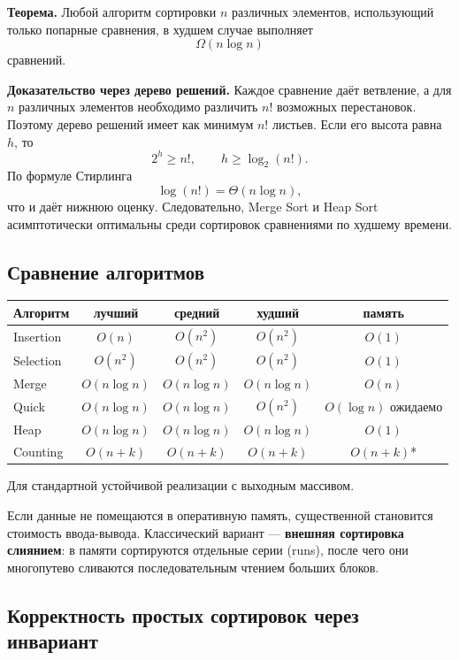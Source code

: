 \textbf{Теорема.} Любой алгоритм сортировки $n$ различных элементов, использующий только попарные сравнения, в худшем случае выполняет
\[
\Omega(n\log n)
\]
сравнений.

\textbf{Доказательство через дерево решений.} Каждое сравнение даёт ветвление, а для $n$ различных элементов необходимо различить $n!$ возможных перестановок. Поэтому дерево решений имеет как минимум $n!$ листьев. Если его высота равна $h$, то
\[
2^h\ge n!,
\qquad
h\ge\log_2(n!).
\]
По формуле Стирлинга
\[
\log(n!)=\Theta(n\log n),
\]
что и даёт нижнюю оценку. Следовательно, Merge Sort и Heap Sort асимптотически оптимальны среди сортировок сравнениями по худшему времени.

\subsection{Сравнение алгоритмов}

\begin{center}
\begin{tabular}{|l|c|c|c|c|}
\hline
\textbf{Алгоритм} & \textbf{лучший} & \textbf{средний} & \textbf{худший} & \textbf{память} \\
\hline
Insertion & $O(n)$ & $O(n^2)$ & $O(n^2)$ & $O(1)$ \\
Selection & $O(n^2)$ & $O(n^2)$ & $O(n^2)$ & $O(1)$ \\
Merge & $O(n\log n)$ & $O(n\log n)$ & $O(n\log n)$ & $O(n)$ \\
Quick & $O(n\log n)$ & $O(n\log n)$ & $O(n^2)$ & $O(\log n)$ ожидаемо \\
Heap & $O(n\log n)$ & $O(n\log n)$ & $O(n\log n)$ & $O(1)$ \\
Counting & $O(n+k)$ & $O(n+k)$ & $O(n+k)$ & $O(n+k)$* \\
\hline
\end{tabular}
\end{center}

\noindent *Для стандартной устойчивой реализации с выходным массивом.

Если данные не помещаются в оперативную память, существенной становится стоимость ввода-вывода. Классический вариант --- \textbf{внешняя сортировка слиянием}: в памяти сортируются отдельные серии (runs), после чего они многопутево сливаются последовательным чтением больших блоков.


\subsection{Корректность простых сортировок через инвариант}

